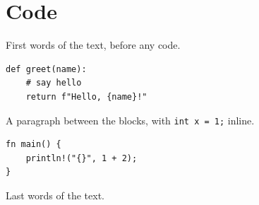 \documentclass{article}
\begin{document}
\section{Code}
First words of the text, before any code.

\begin{verbatim}
def greet(name):
    # say hello
    return f"Hello, {name}!"
\end{verbatim}

A paragraph between the blocks, with \texttt{int x = 1;} inline.

\begin{verbatim}
fn main() {
    println!("{}", 1 + 2);
}
\end{verbatim}

Last words of the text.
\end{document}
